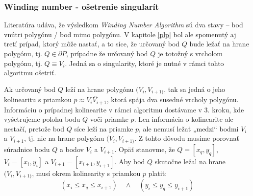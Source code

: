 \documentclass[11pt]{article}
\begin{document}

\subsubsection{Winding number - ošetrenie singularít}
Literatúra udáva, že výsledkom \textit{Winding Number Algorithm} sú dva stavy -- bod vnútri \linebreak
polygónu / bod mimo polygónu. V kapitole \ref{plp} bol ale spomenutý aj tretí prípad, ktorý môže nastať, a to síce, že určovaný bod $Q$ bude ležať na hrane polygónu, tj. $Q \in \partial P$, prípadne že určovaný bod $Q$ je totožný s vrcholom polygónu, tj. $Q \equiv V_i$. Jedná sa o singularity, ktoré je nutné v rámci tohto algoritmu ošetriť.

Ak určovaný bod $Q$ leží na hrane polygónu $(V_i, V_{i+1)}$, tak sa jedná o jeho kolinearitu 
s priamkou $p \approx \overleftrightarrow{V_iV_{i+1}}$, ktorá spája dva susedné vrcholy polygónu. Informáciu o prípadnej kolinearite v rámci algoritmu dostávame v 3. kroku, kde vyšetrujeme polohu bodu $Q$ voči priamke $p$. Len informácia o kolinearite ale nestačí, pretože bod $Q$ síce leží na priamke $p$, ale nemusí ležať „medzi“ bodmi $V_i$ a $V_{i+1}$, tj. nie na hrane polygónu $(V_i, V_{i+1)}$. Z tohto dôvodu musíme porovnať súradnice bodu $Q$ a bodov $V_i$ a $V_{i+1}$.\newline
Opäť stanovme, že $Q=[x_q,y_q]$, $V_i=[x_i,y_i]$ a $V_{i+1}=[x_{i+1},y_{i+1}]$. Aby bod $Q$ skutočne ležal na hrane $(V_i, V_{i+1)}$, musí okrem kolinearity s priamkou $p$ platiť:
\begin{equation*}
(x_i\leq x_q \leq x_{i+1}) \quad \wedge \quad (y_i \leq y_q \leq y_{i+1})
\end{equation*}
\newpage
\end{document}
